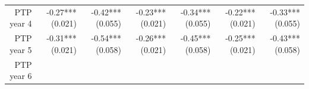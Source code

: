 \documentclass[]{article}
\begin{document}
\begin{longtable}[c]{@{}rrrrrrr@{}}
\begin{minipage}[t]{0.12\columnwidth}
PTP year 4
\strut\end{minipage} &
\begin{minipage}[t]{0.11\columnwidth}\raggedleft\strut
-0.27*** (0.021)
\strut\end{minipage} &
\begin{minipage}[t]{0.12\columnwidth}\raggedleft\strut
-0.42*** (0.055)
\strut\end{minipage} &
\begin{minipage}[t]{0.11\columnwidth}\raggedleft\strut
-0.23*** (0.021)
\strut\end{minipage} &
\begin{minipage}[t]{0.12\columnwidth}\raggedleft\strut
-0.34*** (0.055)
\strut\end{minipage} &
\begin{minipage}[t]{0.11\columnwidth}\raggedleft\strut
-0.22*** (0.021)
\strut\end{minipage} &
\begin{minipage}[t]{0.11\columnwidth}\raggedleft\strut
-0.33*** (0.055)
\strut\end{minipage}\tabularnewline
\begin{minipage}[t]{0.12\columnwidth}\raggedleft\strut
PTP year 5
\strut\end{minipage} &
\begin{minipage}[t]{0.11\columnwidth}\raggedleft\strut
-0.31*** (0.021)
\strut\end{minipage} &
\begin{minipage}[t]{0.12\columnwidth}\raggedleft\strut
-0.54*** (0.058)
\strut\end{minipage} &
\begin{minipage}[t]{0.11\columnwidth}\raggedleft\strut
-0.26*** (0.021)
\strut\end{minipage} &
\begin{minipage}[t]{0.12\columnwidth}\raggedleft\strut
-0.45*** (0.058)
\strut\end{minipage} &
\begin{minipage}[t]{0.11\columnwidth}\raggedleft\strut
-0.25*** (0.021)
\strut\end{minipage} &
\begin{minipage}[t]{0.11\columnwidth}\raggedleft\strut
-0.43*** (0.058)
\strut\end{minipage}\tabularnewline
\begin{minipage}[t]{0.12\columnwidth}\raggedleft\strut
PTP year 6
\strut\end{minipage} &
\begin{minipage}[t]{0.11\columnwidth}\raggedleft\strut

\end{minipage}
\end{longtable}
\end{document}
